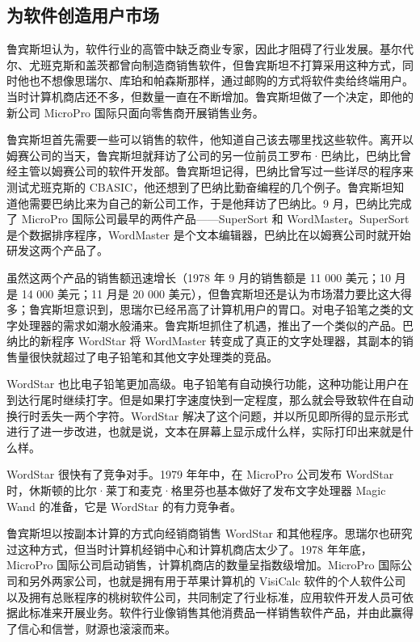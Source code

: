 \documentclass[12pt,UTF8]{ctexbook}
\begin{document}
\subsection{为软件创造用户市场}


鲁宾斯坦认为，软件行业的高管中缺乏商业专家，因此才阻碍了行业发展。基尔代尔、尤班克斯和盖茨都曾向制造商销售软件，但鲁宾斯坦不打算采用这种方式，同时他也不想像思瑞尔、库珀和帕森斯那样，通过邮购的方式将软件卖给终端用户。当时计算机商店还不多，但数量一直在不断增加。鲁宾斯坦做了一个决定，即他的新公司 MicroPro 国际只面向零售商开展销售业务。

鲁宾斯坦首先需要一些可以销售的软件，他知道自己该去哪里找这些软件。离开以姆赛公司的当天，鲁宾斯坦就拜访了公司的另一位前员工罗布·巴纳比，巴纳比曾经主管以姆赛公司的软件开发部。鲁宾斯坦记得，巴纳比曾写过一些详尽的程序来测试尤班克斯的 CBASIC，他还想到了巴纳比勤奋编程的几个例子。鲁宾斯坦知道他需要巴纳比来为自己的新公司工作，于是他拜访了巴纳比。9 月，巴纳比完成了 MicroPro 国际公司最早的两件产品——SuperSort 和 WordMaster。SuperSort 是个数据排序程序，WordMaster 是个文本编辑器，巴纳比在以姆赛公司时就开始研发这两个产品了。

虽然这两个产品的销售额迅速增长（1978 年 9 月的销售额是 11 000 美元；10 月是 14 000 美元；11 月是 20 000 美元），但鲁宾斯坦还是认为市场潜力要比这大得多；鲁宾斯坦意识到，思瑞尔已经吊高了计算机用户的胃口。对电子铅笔之类的文字处理器的需求如潮水般涌来。鲁宾斯坦抓住了机遇，推出了一个类似的产品。巴纳比的新程序 WordStar 将 WordMaster 转变成了真正的文字处理器，其副本的销售量很快就超过了电子铅笔和其他文字处理类的竞品。

WordStar 也比电子铅笔更加高级。电子铅笔有自动换行功能，这种功能让用户在到达行尾时继续打字。但是如果打字速度快到一定程度，那么就会导致软件在自动换行时丢失一两个字符。WordStar 解决了这个问题，并以所见即所得的显示形式进行了进一步改进，也就是说，文本在屏幕上显示成什么样，实际打印出来就是什么样。

WordStar 很快有了竞争对手。1979 年年中，在 MicroPro 公司发布 WordStar 时，休斯顿的比尔·莱丁和麦克·格里芬也基本做好了发布文字处理器 Magic Wand 的准备，它是 WordStar 的有力竞争者。

鲁宾斯坦以按副本计算的方式向经销商销售 WordStar 和其他程序。思瑞尔也研究过这种方式，但当时计算机经销中心和计算机商店太少了。1978 年年底，MicroPro 国际公司启动销售，计算机商店的数量呈指数级增加。MicroPro 国际公司和另外两家公司，也就是拥有用于苹果计算机的 VisiCalc 软件的个人软件公司以及拥有总账程序的桃树软件公司，共同制定了行业标准，应用软件开发人员可依据此标准来开展业务。软件行业像销售其他消费品一样销售软件产品，并由此赢得了信心和信誉，财源也滚滚而来。
\end{document}
